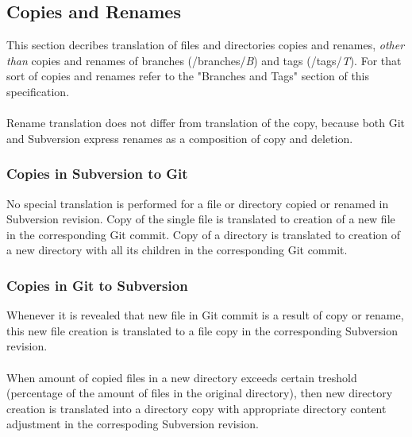\subsection{Copies and Renames}
This section decribes translation of files and directories copies and renames, \emph{other than} copies and renames of 
branches (/branches/\emph{B}) and tags (/tags/\emph{T}). For that sort of copies and renames refer to the "Branches and Tags" 
section of this specification.\\\\
Rename translation does not differ from translation of the copy, because both Git and Subversion
express renames as a composition of copy and deletion. 

\subsubsection{Copies in Subversion to Git}
No special translation is performed for a file or directory copied or renamed in Subversion revision. Copy of the single file is translated 
to creation of a new file in the corresponding Git commit. Copy of a directory is translated to creation of a new directory with all its children
in the corresponding Git commit.

\subsubsection{Copies in Git to Subversion}
Whenever it is revealed that new file in Git commit is a result of copy or rename, this new file creation is translated to a file copy in the 
corresponding Subversion revision.\\\\ 
When amount of copied files in a new directory exceeds certain treshold (percentage of the amount of files in the original directory), then new directory
creation is translated into a directory copy with appropriate directory content adjustment in the correspoding Subversion revision.